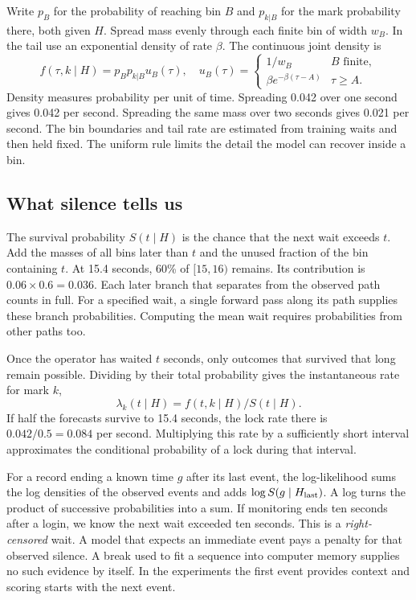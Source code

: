 \documentclass[sigconf,nonacm]{acmart}
\begin{document}
Write $p_B$ for the probability of reaching bin $B$ and $p_{k|B}$ for the mark probability there, both given $H$. Spread mass evenly through each finite bin of width $w_B$. In the tail use an exponential density of rate $\beta$. The continuous joint density is
\begin{equation}
 f(\tau,k\mid H)=p_B p_{k|B}u_B(\tau),\quad
 u_B(\tau)=\begin{cases}1/w_B & B\text{ finite},\\
 \beta e^{-\beta(\tau-A)} & \tau\ge A.\end{cases}
\end{equation}
Density measures probability per unit of time. Spreading 0.042 over one second gives 0.042 per second. Spreading the same mass over two seconds gives 0.021 per second. The bin boundaries and tail rate are estimated from training waits and then held fixed. The uniform rule limits the detail the model can recover inside a bin.

\subsection{What silence tells us}
The survival probability $S(t\mid H)$ is the chance that the next wait exceeds $t$. Add the masses of all bins later than $t$ and the unused fraction of the bin containing $t$. At 15.4 seconds, 60\% of $[15,16)$ remains. Its contribution is $0.06\times0.6=0.036$. Each later branch that separates from the observed path counts in full. For a specified wait, a single forward pass along its path supplies these branch probabilities. Computing the mean wait requires probabilities from other paths too.

Once the operator has waited $t$ seconds, only outcomes that survived that long remain possible. Dividing by their total probability gives the instantaneous rate for mark $k$,
\begin{equation}
 \lambda_k(t\mid H)=f(t,k\mid H)/S(t\mid H).
\end{equation}
If half the forecasts survive to 15.4 seconds, the lock rate there is $0.042/0.5=0.084$ per second. Multiplying this rate by a sufficiently short interval approximates the conditional probability of a lock during that interval.

For a record ending a known time $g$ after its last event, the log-likelihood sums the log densities of the observed events and adds $\log S(g\mid H_{\rm last})$. A log turns the product of successive probabilities into a sum. If monitoring ends ten seconds after a login, we know the next wait exceeded ten seconds. This is a \emph{right-censored} wait. A model that expects an immediate event pays a penalty for that observed silence. A break used to fit a sequence into computer memory supplies no such evidence by itself. In the experiments the first event provides context and scoring starts with the next event.
\end{document}
